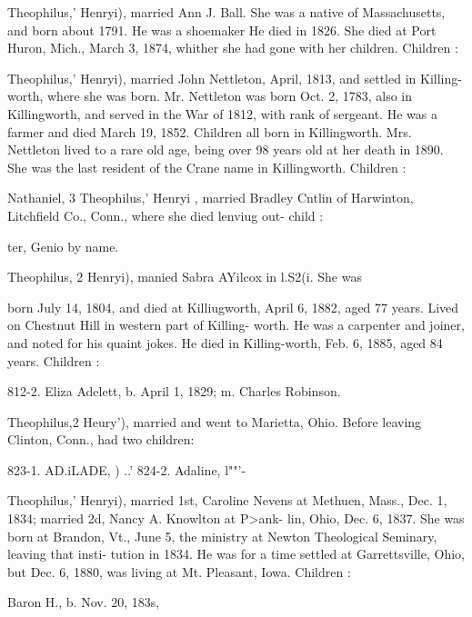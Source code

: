 \documentclass{book}
\begin{document}
Theophilus,' Henryi), married Ann J. Ball. She was a native 
of Massachusetts, and born about 1791. He was a shoemaker 
He died in 1826. She died at Port Huron, Mich., March 3, 
1874, whither she had gone with her children. Children : 


Theophilus,' Henryi), married John Nettleton, April, 1813, and 
settled in Killing-worth, where she was born. Mr. Nettleton was 
born Oct. 2, 1783, also in Killingworth, and served in the War 
of 1812, with rank of sergeant. He was a farmer and died 
March 19, 1852. Children all born in Killingworth. Mrs. 
Nettleton lived to a rare old age, being over 98 years old at her 
death in 1890. She was the last resident of the Crane name in 
Killingworth. Children : 





Nathaniel, 3 Theophilus,' Henryi , married Bradley Cntlin of 
Harwinton, Litchfield Co., Conn., where she died lenviug out- 
child : 

ter, Genio by name. 

Theophilus, 2 Henryi), manied Sabra AYilcox in l.S2(i. She was 




born July 14, 1804, and died at Killiugworth, April 6, 1882, 
aged 77 years. Lived on Chestnut Hill in western part of Killing- 
worth. He was a carpenter and joiner, and noted for his quaint 
jokes. He died in Killing-worth, Feb. 6, 1885, aged 84 years. 
Children : 


812-2. Eliza Adelett, b. April 1, 1829; m. Charles Robinson. 










Theophilus,2 Heury'), married and went to Marietta, Ohio. 
Before leaving Clinton, Conn., had two children: 

823-1. AD.iLADE, ) ..' 
824-2. Adaline, l""'- 

Theophilus,' Henryi), married 1st, Caroline Nevens at Methuen, 
Mass., Dec. 1, 1834; married 2d, Nancy A. Knowlton at P>ank- 
lin, Ohio, Dec. 6, 1837. She was born at Brandon, Vt., June 5, 
the ministry at Newton Theological Seminary, leaving that insti- 
tution in 1834. He was for a time settled at Garrettsville, Ohio, 
but Dec. 6, 1880, was living at Mt. Pleasant, Iowa. Children : 





Baron H., b. Nov. 20, 183s, 
\end{document}

